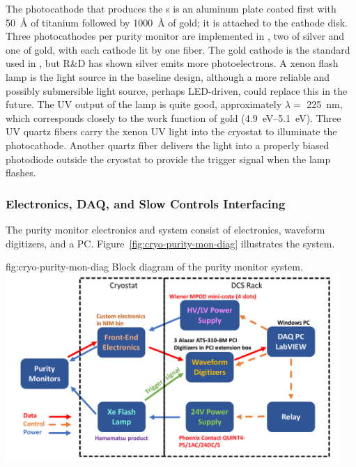 The photocathode that produces the \phel{}s is an aluminum plate coated first with \SI{50}{\angstrom} of titanium followed by \SI{1000}{\angstrom} of gold; it is attached to the cathode disk.
Three photocathodes per purity monitor are implemented in , two of silver and one of gold, with each cathode lit by one fiber. The gold cathode is the standard used in , but R\&D has shown silver emits more photoelectrons.
A xenon flash lamp is the light source in the baseline design, although %
a more reliable and possibly submersible light source, perhaps LED-driven, could replace this in the future. The UV output of the lamp is quite good, approximately $\lambda=$ \SI{225}{\nano\meter}, which corresponds closely to the work function of gold (\SIrange{4.9}{5.1}{\eV}). 
Three UV quartz fibers carry the xenon UV light into the cryostat to illuminate the %
photocathode.   Another quartz fiber delivers the light into a properly biased photodiode outside the cryostat to provide the trigger signal when the lamp flashes. 



\subsubsection{Electronics, DAQ, and Slow Controls Interfacing}
The purity monitor electronics and  system consist of  electronics, waveform digitizers, and a  PC.  Figure~\ref{fig:cryo-purity-mon-diag} %
illustrates the system.

\begin{dunefigure}{fig:cryo-purity-mon-diag}
  {Block diagram of the purity monitor system.}
  \includegraphics[width=0.95\textwidth]{graphics/PrMon_BlockDiagram_v2.pdf}
\end{dunefigure}


